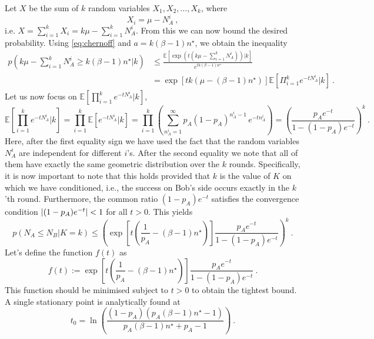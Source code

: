 \documentclass[aps,pra,reprint,superscriptaddress]{revtex4-1}
\newcommand{\nstar}{n^{\star}}
\begin{document}
Let $X$ be the sum of $k$ random variables $X_1, X_2, \dots, X_k$, where
\begin{equation}
X_i = \mu - N_{A}^i\ ,
\end{equation}
i.e. $X = \sum_{i=1}^{k} X_i = k \mu - \sum_{i=1}^{k}N_{A}^i.$
From this we can now bound the desired probability. Using
\eqref{eq:chernoff} and $a=k(\beta-1)\nstar$, we obtain the inequality
\begin{align}
p\left( k \mu -\sum_{i=1}^{k}N_{A}^i \ge  k (\beta -1) \nstar \Big\vert k\right)	&\le  \frac{\mathbb{E}\left[\exp\left(t\left(k \mu - \sum_{i=1}^{k}N_A^i\right)\right) \Big\vert k\right]}{e^{t k(\beta-1)\nstar}} \\&= \exp\left[t k\left(\mu - (\beta-1) \nstar\right)\right]\mathbb{E}\left[\Pi_{i=1}^k e^{-t N_A^i}\vert k\right]\ .
\end{align}
Let us now focus on $\mathbb{E}\left[\prod_{i=1}^k e^{-t N_A^i}\vert k\right]$,
\begin{equation}
\mathbb{E}\left[\prod_{i=1}^k e^{-t N_A^i}\vert k\right] = \prod_{i=1}^k \mathbb{E}\left[e^{-t N_A^i}\vert k\right] = \prod_{i=1}^k\left(\sum_{n_A^i = 1}^\infty p_A (1-p_A)^{n_A^i - 1}\, e^{-t n_A^i}\right) = \left(\frac{p_A e^{-t}}{1-(1-p_A)e^{-t}}\right)^k\ .
\end{equation}
Here, after the first equality sign we have used the fact that the random variables $N_A^i$ are independent for different $i$'s. After the second equality we note that all of them have exactly the same geometric distribution over the $k$ rounds. Specifically, it is now important to note that this holds provided that $k$ is the value of $K$ on which we have conditioned, i.e., the success on Bob's side occurs exactly in the $k$'th round. Furthermore, the common ratio $(1-p_A) e^{-t}$ satisfies the convergence condition $\abs{(1-p_A) e^{-t}} <1$ for all $t>0$. This yields
\begin{equation}
p\left(N_A \leq N_B \vert K = k\right) \leq \left(\exp\left[t \left(\frac{1}{p_A} - (\beta-1) \nstar\right)\right]\frac{p_A e^{-t}}{1-(1-p_A)e^{-t}}\right)^{k}\ .
\end{equation}
Let's define the function $f(t)$ as
\begin{equation}
f(t) := \exp\left[t \left(\frac{1}{p_A} - (\beta-1) \nstar\right)\right]\frac{p_A e^{-t}}{1-(1-p_A)e^{-t}}\ .
\end{equation}
This function should be minimised subject to $t>0$ to obtain the tightest bound. A single stationary point is analytically found at
\begin{equation}
t_0 = \ln\left(\frac{(1-p_A) (p_A (\beta-1)\nstar - 1)}{p_A (\beta-1)\nstar + p_A - 1}\right)\ .
\end{equation}
\end{document}
